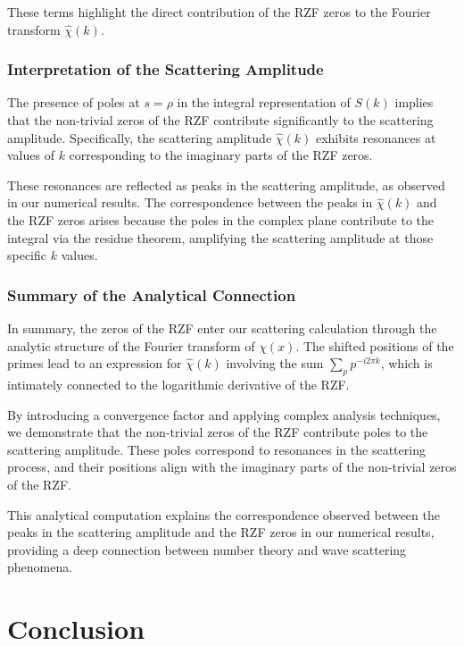 \documentclass[11pt, oneside]{article}
\begin{document}
These terms highlight the direct contribution of the RZF zeros to the Fourier transform $\hat{\chi}(k)$.

\subsubsection{Interpretation of the Scattering Amplitude}

The presence of poles at $s = \rho$ in the integral representation of $S(k)$ implies that the non-trivial zeros of the RZF contribute significantly to the scattering amplitude. Specifically, the scattering amplitude $\hat{\chi}(k)$ exhibits resonances at values of $k$ corresponding to the imaginary parts of the RZF zeros.

These resonances are reflected as peaks in the scattering amplitude, as observed in our numerical results. The correspondence between the peaks in $\hat{\chi}(k)$ and the RZF zeros arises because the poles in the complex plane contribute to the integral via the residue theorem, amplifying the scattering amplitude at those specific $k$ values.

\subsubsection{Summary of the Analytical Connection}

In summary, the zeros of the RZF enter our scattering calculation through the analytic structure of the Fourier transform of $\chi(x)$. The shifted positions of the primes lead to an expression for $\hat{\chi}(k)$ involving the sum $\sum_{p} p^{-i 2\pi k}$, which is intimately connected to the logarithmic derivative of the RZF.

By introducing a convergence factor and applying complex analysis techniques, we demonstrate that the non-trivial zeros of the RZF contribute poles to the scattering amplitude. These poles correspond to resonances in the scattering process, and their positions align with the imaginary parts of the non-trivial zeros of the RZF.

This analytical computation explains the correspondence observed between the peaks in the scattering amplitude and the RZF zeros in our numerical results, providing a deep connection between number theory and wave scattering phenomena.

\section{Conclusion}
\end{document}
